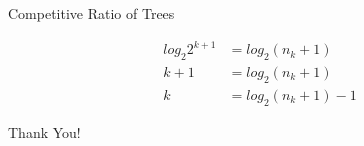 \documentclass{beamer}
\begin{document}
\begin{frame}{Competitive Ratio of Trees}
{{\begin{itemize}
{\begin{align*}
              log_2{2^{k+1}} &= log_2{(n_k + 1)} \\ 
              k + 1 &= log_2{(n_k + 1)} \\ 
              k &= log_2{(n_k + 1)} - 1 
          \end{align*}
    }
\end{itemize}
}
% 
% 
} 
% 
% 
% 
% 
% 
%    
\end{frame} 
\begin{frame}
\begin{center}
{\fontsize{40}{50}\selectfont Thank You!}
\end{center}
\end{frame}

% 
% 
% 
% 
% 
% 
\end{document}
